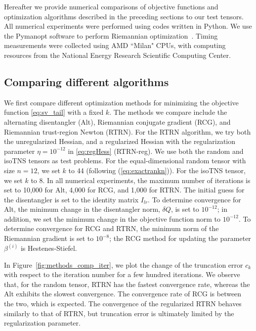 \documentclass[pdflatex,sn-mathphys-num]{sn-jnl}
\newcounter{thm}[section]
\begin{document}
Hereafter we provide numerical comparisons of objective functions and optimization algorithms described in the preceding sections to our test tensors. All numerical experiments were performed using codes written in Python. We use the Pymanopt software to perform Riemannian optimization~\cite{JMLR:v17:16-177}. Timing measurements were collected using AMD ``Milan" CPUs, with computing resources from the National Energy Research Scientific Computing Center.
%
\subsection{Comparing different algorithms}
 We first compare different optimization methods for minimizing the objective function \eqref{eq:sv_tail} with a fixed $k$. The methods we compare include the alternating disentangler (Alt), Riemannian conjugate gradient (RCG), and Riemannian trust-region Newton (RTRN). For the RTRN algorithm, we try both the unregularized Hessian, and a regularized Hessian with the regularization parameter $\eta = 10^{-12}$ in \eqref{eq:regHess} (RTRN-reg). We use both the random and isoTNS tensors as test problems. For the equal-dimensional random tensor with size $n=12$, we set $k$ to 44 (following (\ref{eq:exactrankn})). For the isoTNS tensor, we set $k$ to 8. In all numerical experiments, the maximum number of iterations is set to 10,000 for Alt, 4,000 for RCG, and 1,000 for RTRN. The initial guess for the disentangler is set to the identity matrix $I_{lr}$. To determine convergence for Alt, the minimum change in the disentangler norm, $\delta Q$, is set to $10^{-12}$; in addition, we set the minimum change in the objective function norm to $10^{-12}$. To determine convergence for RCG and RTRN, the minimum norm of the Riemannian gradient is set to $10^{-8}$; the RCG method for updating the parameter $\beta^{(i)}$ is Hestenes-Stiefel.

In Figure~\ref{fig:methods_comp_iter}, we plot the change of the truncation error $c_k$ with respect to the iteration number for a few hundred iterations. We observe that, for the random tensor, RTRN has the fastest convergence rate, whereas the Alt exhibits the slowest convergence. The convergence rate of RCG is between the two, which is expected. The convergence of the regularized RTRN behaves similarly to that of RTRN, but truncation error is ultimately limited by the regularization parameter.
\end{document}

